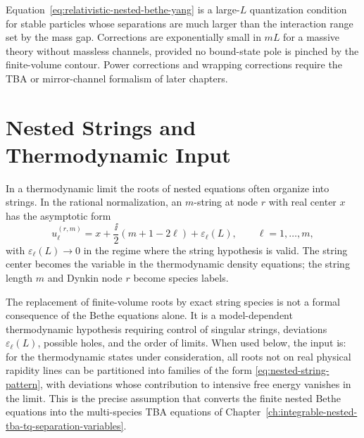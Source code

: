 \begin{controlledapproximation}
\label{ca:matrix-bethe-yang-large-volume}
Equation~\eqref{eq:relativistic-nested-bethe-yang} is a large-\(L\)
quantization condition for stable particles whose separations are much larger
than the interaction range set by the mass gap.  Corrections are
exponentially small in \(mL\) for a massive theory without massless channels,
provided no bound-state pole is pinched by the finite-volume contour.  Power
corrections and wrapping corrections require the TBA or mirror-channel
formalism of later chapters.
\end{controlledapproximation}

\section{Nested Strings and Thermodynamic Input}

In a thermodynamic limit the roots of nested equations often organize into
strings.  In the rational normalization, an \(m\)-string at node \(r\) with
real center \(x\) has the asymptotic form
\begin{equation}
  u_{\ell}^{(r,m)}
  =
  x+\frac{\ii}{2}(m+1-2\ell)+\varepsilon_\ell(L),
  \qquad \ell=1,\ldots,m,
  \label{eq:nested-string-pattern}
\end{equation}
with \(\varepsilon_\ell(L)\to0\) in the regime where the string hypothesis is
valid.  The string center becomes the variable in the thermodynamic density
equations; the string length \(m\) and Dynkin node \(r\) become species
labels.

\begin{hypothesis}
\label{ca:nested-string-hypothesis}
The replacement of finite-volume roots by exact string species is not a
formal consequence of the Bethe equations alone.  It is a model-dependent
thermodynamic hypothesis requiring control of singular strings, deviations
\(\varepsilon_\ell(L)\), possible holes, and the order of limits.  When used
below, the input is: for the thermodynamic states under consideration, all
roots not on real physical rapidity lines can be partitioned into families of
the form \eqref{eq:nested-string-pattern}, with deviations whose contribution
to intensive free energy vanishes in the limit.  This is the precise
assumption that converts the finite nested Bethe equations into the
multi-species TBA equations of
Chapter~\ref{ch:integrable-nested-tba-tq-separation-variables}.
\end{hypothesis}

